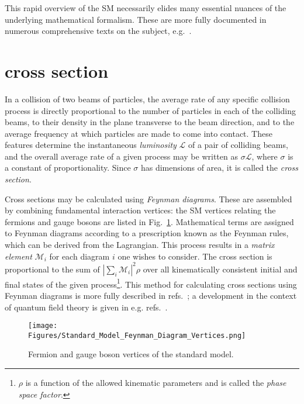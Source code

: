 This rapid overview of the SM necessarily elides many essential nuances of the underlying mathematical formalism. These are more fully
documented in numerous comprehensive texts on the subject, e.g.~\cite{ref:HalzenMartin, ref:BargerPhillips, ref:PeskinSchroeder, ref:Srednicki, ref:Schwartz}.

\section{\texorpdfstring{\zinvg}{Z(νν)γ} cross section} \label{sec:introduction_znng}
In a collision of two beams of particles, the average rate of any specific collision process is directly proportional to the
number of particles in each of the colliding beams, to their density in the plane transverse to the beam direction, and to the average
frequency at which particles are made to come into contact. These features determine the instantaneous \textit{luminosity} $\mathcal{L}$ of a pair
of colliding beams, and the overall average rate of a given process may be written as $\sigma \mathcal{L}$, where $\sigma$
is a constant of proportionality. Since $\sigma$ has dimensions of area, it is called the \textit{cross section}.

Cross sections may be calculated using \textit{Feynman diagrams}. These are
assembled by combining fundamental interaction vertices: the SM vertices relating the fermions and gauge bosons are listed in Fig.~\ref{fig:sm_vertices}.
Mathematical terms are assigned to Feynman diagrams according to a prescription known as the Feynman rules, which can be derived from the Lagrangian.
This process results in a \textit{matrix element} $\mathcal{M}_{i}$ for each diagram $i$ one wishes to consider. The cross section is proportional to the sum of $|\sum_{i}{\mathcal{M}_{i}}|^{2}\rho$
over all kinematically consistent initial and final states of the given process\footnote{$\rho$ is a function of the allowed kinematic parameters and is called the \textit{phase space
factor}.}. This method for calculating cross sections using Feynman diagrams is more fully described in refs.~\cite{ref:HalzenMartin, ref:BargerPhillips};
a development in the context of quantum field theory is given in e.g. refs.~\cite{ref:PeskinSchroeder, ref:Srednicki, ref:Schwartz}.

\begin{figure}[hbtp]
  \begin{center}
    \texttt{[image: Figures/Standard\_Model\_Feynman\_Diagram\_Vertices.png]}
    \caption{
      Fermion and gauge boson vertices of the standard model.
    }
    \label{fig:sm_vertices}
  \end{center}
\end{figure}

